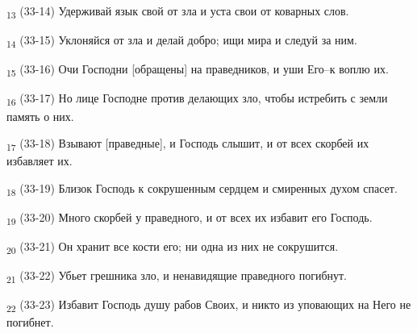 \begin{tcolorbox}
\textsubscript{13} (33-14) Удерживай язык свой от зла и уста свои от коварных слов.
\end{tcolorbox}
\begin{tcolorbox}
\textsubscript{14} (33-15) Уклоняйся от зла и делай добро; ищи мира и следуй за ним.
\end{tcolorbox}
\begin{tcolorbox}
\textsubscript{15} (33-16) Очи Господни [обращены] на праведников, и уши Его--к воплю их.
\end{tcolorbox}
\begin{tcolorbox}
\textsubscript{16} (33-17) Но лице Господне против делающих зло, чтобы истребить с земли память о них.
\end{tcolorbox}
\begin{tcolorbox}
\textsubscript{17} (33-18) Взывают [праведные], и Господь слышит, и от всех скорбей их избавляет их.
\end{tcolorbox}
\begin{tcolorbox}
\textsubscript{18} (33-19) Близок Господь к сокрушенным сердцем и смиренных духом спасет.
\end{tcolorbox}
\begin{tcolorbox}
\textsubscript{19} (33-20) Много скорбей у праведного, и от всех их избавит его Господь.
\end{tcolorbox}
\begin{tcolorbox}
\textsubscript{20} (33-21) Он хранит все кости его; ни одна из них не сокрушится.
\end{tcolorbox}
\begin{tcolorbox}
\textsubscript{21} (33-22) Убьет грешника зло, и ненавидящие праведного погибнут.
\end{tcolorbox}
\begin{tcolorbox}
\textsubscript{22} (33-23) Избавит Господь душу рабов Своих, и никто из уповающих на Него не погибнет.
\end{tcolorbox}
